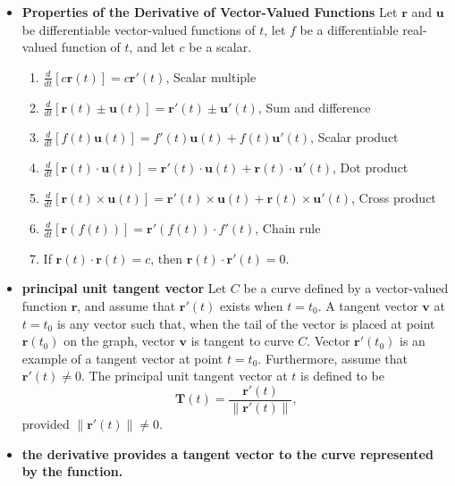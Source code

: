 \documentclass{report}
\begin{document}
\begin{itemize}
\begin{itemize}
           \end{itemize}
           \pagebreak 
       \item \textbf{Properties of the Derivative of Vector-Valued Functions}
           Let $\mathbf{r}$ and $\mathbf{u}$ be differentiable vector-valued functions of $t$, let $f$ be a differentiable real-valued function of $t$, and let $c$ be a scalar.
           \begin{enumerate}
               \item $\frac{d}{dt}[c\mathbf{r}(t)] = c\mathbf{r}'(t)$, Scalar multiple
               \item $\frac{d}{dt}[\mathbf{r}(t) \pm \mathbf{u}(t)] = \mathbf{r}'(t) \pm \mathbf{u}'(t)$, Sum and difference
               \item $\frac{d}{dt}[f(t)\mathbf{u}(t)] = f'(t)\mathbf{u}(t) + f(t)\mathbf{u}'(t)$, Scalar product
               \item $\frac{d}{dt}[\mathbf{r}(t) \cdot \mathbf{u}(t)] = \mathbf{r}'(t) \cdot \mathbf{u}(t) + \mathbf{r}(t) \cdot \mathbf{u}'(t)$, Dot product
               \item $\frac{d}{dt}[\mathbf{r}(t) \times \mathbf{u}(t)] = \mathbf{r}'(t) \times \mathbf{u}(t) + \mathbf{r}(t) \times \mathbf{u}'(t)$, Cross product
               \item $\frac{d}{dt}[\mathbf{r}(f(t))] = \mathbf{r}'(f(t)) \cdot f'(t)$, Chain rule
               \item If $\mathbf{r}(t) \cdot \mathbf{r}(t) = c$, then $\mathbf{r}(t) \cdot \mathbf{r}'(t) = 0$.
           \end{enumerate}
       \item \textbf{principal unit tangent vector}
           Let $C$ be a curve defined by a vector-valued function $\mathbf{r}$, and assume that $\mathbf{r}'(t)$ exists when $t = t_0$. A tangent vector $\mathbf{v}$ at $t = t_0$ is any vector such that, when the tail of the vector is placed at point $\mathbf{r}(t_0)$ on the graph, vector $\mathbf{v}$ is tangent to curve $C$. Vector $\mathbf{r}'(t_0)$ is an example of a tangent vector at point $t = t_0$. Furthermore, assume that $\mathbf{r}'(t) \neq 0$. The principal unit tangent vector at $t$ is defined to be
           \begin{equation}
               \mathbf{T}(t) = \frac{\mathbf{r}'(t)}{\|\mathbf{r}'(t)\|},
           \end{equation}
           provided $\|\mathbf{r}'(t)\| \neq 0.$
        \item \textbf{the derivative provides a tangent vector to the curve represented by the function.} 

\end{itemize}
\end{document}
